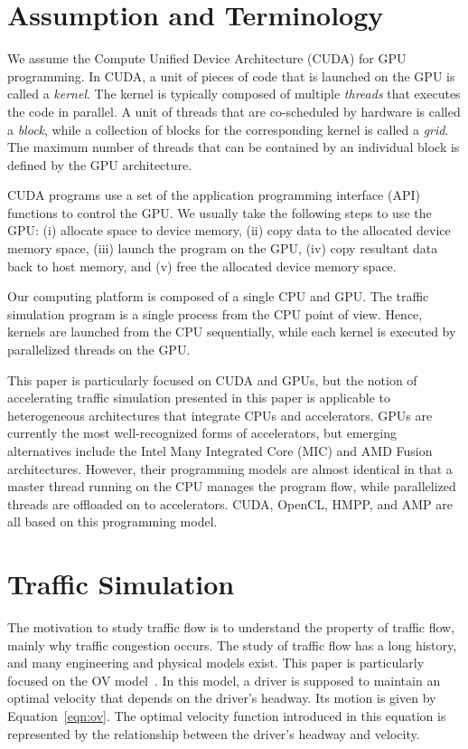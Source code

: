 \documentclass[times, 10pt, twocolumn]{article}
\begin{document}
\section{Assumption and Terminology}
\label{sec:assumption}

We assume the Compute Unified Device Architecture (CUDA) for GPU
programming.
In CUDA, a unit of pieces of code that is launched on the GPU is called
a \textit{kernel}.
The kernel is typically composed of multiple \textit{threads} that
executes the code in parallel.
A unit of threads that are co-scheduled by hardware is called a
\textit{block}, while a collection of blocks for the corresponding
kernel is called a \textit{grid}.  
The maximum number of threads that can be contained by an individual
block is defined by the GPU architecture.

CUDA programs use a set of the application programming interface (API)
functions to control the GPU.
We usually take the following steps to use the GPU: (i) allocate space
to device memory, (ii) copy data to the allocated device memory space,
(iii) launch the program on the GPU, (iv) copy resultant data back to
host memory, and (v) free the allocated device memory space. 

Our computing platform is composed of a single CPU and GPU.
The traffic simulation program is a single process from the CPU point of
view.
Hence, kernels are launched from the CPU sequentially, while each kernel
is executed by parallelized threads on the GPU.

This paper is particularly focused on CUDA and GPUs, but the notion of
accelerating traffic simulation presented in this paper is applicable to
heterogeneous architectures that integrate CPUs and accelerators.
GPUs are currently the most well-recognized forms of accelerators, but
emerging alternatives include the Intel Many Integrated Core (MIC) and
AMD Fusion architectures.
However, their programming models are almost identical in that a master
thread running on the CPU manages the program flow, while parallelized
threads are offloaded on to accelerators.
CUDA, OpenCL, HMPP, and AMP are all based on this programming model.

\section{Traffic Simulation}
\label{sec:traffic_simulation}

The motivation to study traffic flow is to understand the property of
traffic flow, mainly why traffic congestion occurs.
The study of traffic flow has a long history, and many engineering and
physical models exist.
This paper is particularly focused on the OV model~\cite{Bando1995,
Bando1995_2}.
In this model, a driver is supposed to maintain an optimal velocity that
depends on the driver's headway.
Its motion is given by Equation~\eqref{eqn:ov}.
The optimal velocity function introduced in this equation is represented
by the relationship between the driver's headway and velocity.
\end{document}
